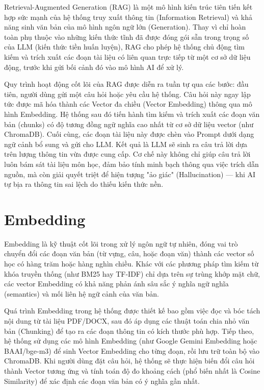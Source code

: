 Retrieval-Augmented Generation (RAG) là một mô hình kiến trúc tiên tiến kết hợp sức mạnh của hệ thống truy xuất thông tin (Information Retrieval) và khả năng sinh văn bản của mô hình ngôn ngữ lớn (Generation). Thay vì chỉ hoàn toàn phụ thuộc vào những kiến thức tĩnh đã được đóng gói sẵn trong trọng số của LLM (kiến thức tiền huấn luyện), RAG cho phép hệ thống chủ động tìm kiếm và trích xuất các đoạn tài liệu có liên quan trực tiếp từ một cơ sở dữ liệu động, trước khi gửi bối cảnh đó vào mô hình AI để xử lý.

Quy trình hoạt động cốt lõi của RAG được diễn ra tuần tự qua các bước: đầu tiên, người dùng gửi một câu hỏi hoặc yêu cầu hệ thống. Câu hỏi này ngay lập tức được mã hóa thành các Vector đa chiều (Vector Embedding) thông qua mô hình Embedding. Hệ thống sau đó tiến hành tìm kiếm và trích xuất các đoạn văn bản (chunks) có độ tương đồng ngữ nghĩa cao nhất từ cơ sở dữ liệu vector (như ChromaDB). Cuối cùng, các đoạn tài liệu này được chèn vào Prompt dưới dạng ngữ cảnh bổ sung và gửi cho LLM. Kết quả là LLM sẽ sinh ra câu trả lời dựa trên lượng thông tin vừa được cung cấp. Cơ chế này không chỉ giúp câu trả lời luôn bám sát tài liệu môn học, đảm bảo tính minh bạch thông qua việc trích dẫn nguồn, mà còn giải quyết triệt để hiện tượng "ảo giác" (Hallucination) — khi AI tự bịa ra thông tin sai lệch do thiếu kiến thức nền.

\section{Embedding}

Embedding là kỹ thuật cốt lõi trong xử lý ngôn ngữ tự nhiên, đóng vai trò chuyển đổi các đoạn văn bản (từ vựng, câu, hoặc đoạn văn) thành các vector số học có hàng trăm hoặc hàng nghìn chiều. Khác với các phương pháp tìm kiếm từ khóa truyền thống (như BM25 hay TF-IDF) chỉ dựa trên sự trùng khớp mặt chữ, các vector Embedding có khả năng phản ánh sâu sắc ý nghĩa ngữ nghĩa (semantics) và mối liên hệ ngữ cảnh của văn bản.

Quá trình Embedding trong hệ thống được thiết kế bao gồm việc đọc và bóc tách nội dung từ tài liệu PDF/DOCX, sau đó áp dụng các thuật toán chia nhỏ văn bản (Chunking) để tạo ra các đoạn thông tin có kích thước phù hợp. Tiếp theo, hệ thống sử dụng các mô hình Embedding (như Google Gemini Embedding hoặc BAAI/bge-m3) để sinh Vector Embedding cho từng đoạn, rồi lưu trữ toàn bộ vào ChromaDB. Khi người dùng đặt câu hỏi, hệ thống sẽ thực hiện biến đổi câu hỏi thành Vector tương ứng và tính toán độ đo khoảng cách (phổ biến nhất là Cosine Similarity) để xác định các đoạn văn bản có ý nghĩa gần nhất.

